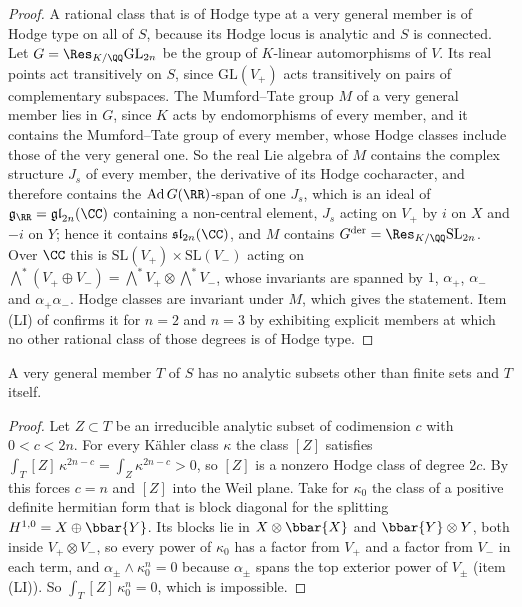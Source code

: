 \begin{proof}
A rational class that is of Hodge type at a very general member is of Hodge
type on all of $S$, because its Hodge locus is analytic and $S$ is connected.
Let $G=\Res_{K/\QQ}\mathrm{GL}_{2n}$ be the group of $K$-linear automorphisms
of $V$. Its real points act transitively on $S$, since
$\mathrm{GL}(V_{+})$ acts transitively on pairs of complementary subspaces.
The Mumford--Tate group $M$ of a very general member lies in $G$, since $K$
acts by endomorphisms of every member, and it contains the Mumford--Tate group
of every member, whose Hodge classes include those of the very general one.
So the real Lie algebra of $M$ contains the complex structure $J_{s}$ of every
member, the derivative of its Hodge cocharacter, and therefore contains the $\mathrm{Ad}\,G(\RR)$-span of one $J_{s}$, which is an ideal of
$\mathfrak{g}_{\RR}=\mathfrak{gl}_{2n}(\CC)$ containing a non-central
element, $J_{s}$ acting on $V_{+}$ by $i$ on $X$ and $-i$ on $Y$; hence it
contains $\mathfrak{sl}_{2n}(\CC)$, and $M$ contains
$G^{\mathrm{der}}=\Res_{K/\QQ}\mathrm{SL}_{2n}$. Over $\CC$ this is
$\mathrm{SL}(V_{+})\times\mathrm{SL}(V_{-})$ acting on
$\bigwedge^{*}(V_{+}\oplus V_{-})=\bigwedge^{*}V_{+}\otimes\bigwedge^{*}V_{-}$,
whose invariants are spanned by $1$, $\alpha_{+}$, $\alpha_{-}$ and
$\alpha_{+}\alpha_{-}$. Hodge classes are invariant under $M$, which gives
the statement. Item (LI) of  confirms it for $n=2$
and $n=3$ by exhibiting explicit members at which no other rational class of
those degrees is of Hodge type.
\end{proof}

\begin{lemma}
\label{lem:weiltorussubsets}
A very general member $T$ of $S$ has no analytic subsets other than finite
sets and $T$ itself.
\end{lemma}

\begin{proof}
Let $Z\subset T$ be an irreducible analytic subset of codimension $c$ with
$0<c<2n$. For every K\"ahler class $\kappa$ the class $[Z]$ satisfies
$\int_{T}[Z]\,\kappa^{2n-c}=\int_{Z}\kappa^{2n-c}>0$, so $[Z]$ is a nonzero
Hodge class of degree $2c$. By  this forces $c=n$ and
$[Z]$ into the Weil plane. Take for $\kappa_{0}$ the class of a positive
definite hermitian form that is block diagonal for the splitting
$H^{1,0}=X\oplus\bbar{Y}$. Its blocks lie in $X\otimes\bbar{X}$ and
$\bbar{Y}\otimes Y$, both inside $V_{+}\otimes V_{-}$, so every power of
$\kappa_{0}$ has a factor from $V_{+}$ and a factor from $V_{-}$ in each term,
and $\alpha_{\pm}\wedge\kappa_{0}^{n}=0$ because $\alpha_{\pm}$ spans the top
exterior power of $V_{\pm}$ (item (LI)). So
$\int_{T}[Z]\,\kappa_{0}^{n}=0$, which is impossible.
\end{proof}

